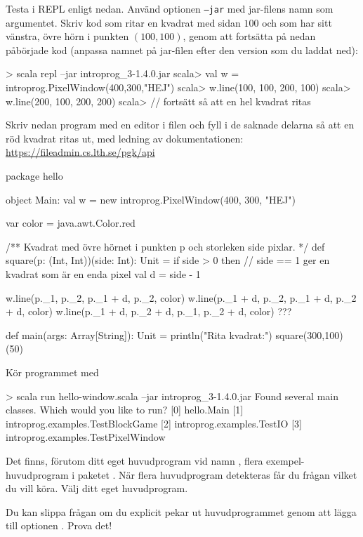 \Subtask Testa  i REPL enligt nedan. Använd optionen \texttt{--jar} med jar-filens namn som argumentet. Skriv kod som ritar en kvadrat med sidan $100$ och som har sitt vänstra, övre hörn i punkten $(100,100)$, genom att fortsätta på nedan påbörjade kod (anpassa namnet på jar-filen efter den version som du laddat ned): 

\begin{REPL}
> scala repl --jar introprog_3-1.4.0.jar
scala> val w = introprog.PixelWindow(400,300,"HEJ")
scala> w.line(100, 100, 200, 100)
scala> w.line(200, 100, 200, 200)
scala> // fortsätt så att en hel kvadrat ritas
\end{REPL}

\Subtask Skriv nedan program med en editor i filen  och fyll i de saknade delarna så att en röd kvadrat ritas ut, med ledning av dokumentationen:\\\url{https://fileadmin.cs.lth.se/pgk/api}

\begin{Code}
package hello

object Main:
  val w = new introprog.PixelWindow(400, 300, "HEJ")

  var color = java.awt.Color.red

  /** Kvadrat med övre hörnet i punkten p och storleken side pixlar. */
  def square(p: (Int, Int))(side: Int): Unit =
    if side > 0 then
      // side == 1 ger en kvadrat som är en enda pixel
      val d = side - 1  

      w.line(p._1,     p._2,     p._1 + d, p._2,     color)
      w.line(p._1 + d, p._2,     p._1 + d, p._2 + d, color)
      w.line(p._1 + d, p._2 + d, p._1,     p._2 + d, color)
      ???

  def main(args: Array[String]): Unit =
    println("Rita kvadrat:")
    square(300,100)(50)
\end{Code}
Kör programmet med
\begin{REPLnonum}
> scala run hello-window.scala --jar introprog_3-1.4.0.jar
Found several main classes. Which would you like to run?
[0] hello.Main
[1] introprog.examples.TestBlockGame
[2] introprog.examples.TestIO
[3] introprog.examples.TestPixelWindow
\end{REPLnonum}
Det finns, förutom  ditt eget huvudprogram vid namn , flera exempel-huvudprogram i paketet . När flera huvudprogram detekteras får du frågan vilket du vill köra. Välj ditt eget huvudprogram.

\Subtask Du kan slippa frågan om du explicit pekar ut huvudprogrammet genom att lägga till optionen . Prova det!

